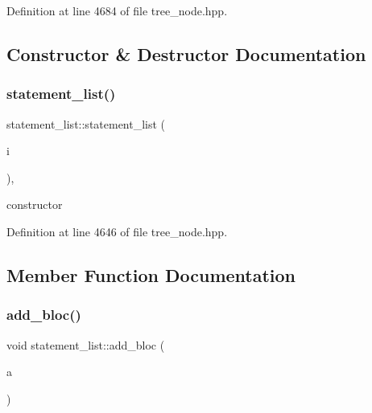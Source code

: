 Definition at line 4684 of file tree\+\_\+node.\+hpp.



\subsection{Constructor \& Destructor Documentation}
\mbox{\label{structstatement__list_ad90399d2c2bd1d1faa1da22ab5352dce}} 
\subsubsection{\texorpdfstring{statement\+\_\+list()}{statement\_list()}}
{\footnotesize\ttfamily statement\+\_\+list\+::statement\+\_\+list (\begin{DoxyParamCaption}\item[{unsigned int}]{i }\end{DoxyParamCaption})\hspace{0.3cm}{\ttfamily [inline]}, {\ttfamily [explicit]}}



constructor 



Definition at line 4646 of file tree\+\_\+node.\+hpp.



\subsection{Member Function Documentation}
\mbox{\label{structstatement__list_a3de214bdf9d29f89ae021af745ad2d72}} 
\subsubsection{\texorpdfstring{add\+\_\+bloc()}{add\_bloc()}}
{\footnotesize\ttfamily void statement\+\_\+list\+::add\+\_\+bloc (\begin{DoxyParamCaption}\item[{const bloc\+Ref \&}]{a }\end{DoxyParamCaption})}



